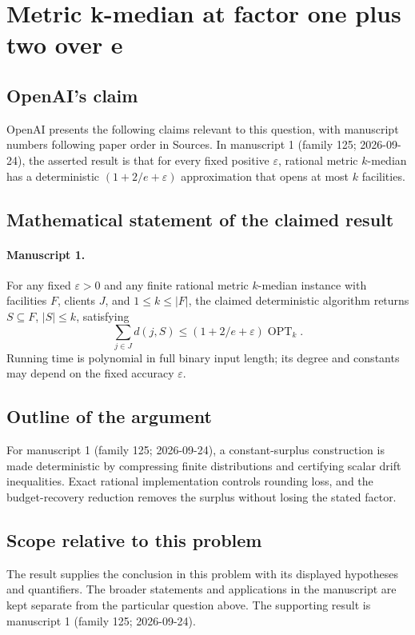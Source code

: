 \documentclass[11pt]{article}
\begin{document}
\section*{Metric k-median at factor one plus two over e}

\subsection{OpenAI's claim}
OpenAI presents the following claims relevant to this question, with manuscript numbers following paper order in Sources. In manuscript 1 (family 125; 2026-09-24), the asserted result is that for every fixed positive $\varepsilon$, rational metric $k$-median has a deterministic $(1+2/e+\varepsilon)$ approximation that opens at most $k$ facilities.

\subsection{Mathematical statement of the claimed result}
\paragraph{Manuscript 1.}
For any fixed $\varepsilon>0$ and any finite rational metric $k$-median instance with facilities $F$, clients $J$, and $1\le k\le|F|$, the claimed deterministic algorithm returns $S\subseteq F$, $|S|\le k$, satisfying
\[
 \sum_{j\in J}d(j,S)\le(1+2/e+\varepsilon)\operatorname{OPT}_k.
\]
Running time is polynomial in full binary input length; its degree and constants may depend on the fixed accuracy $\varepsilon$.

\subsection{Outline of the argument}
For manuscript 1 (family 125; 2026-09-24), a constant-surplus construction is made deterministic by compressing finite distributions and certifying scalar drift inequalities. Exact rational implementation controls rounding loss, and the budget-recovery reduction removes the surplus without losing the stated factor.

\subsection{Scope relative to this problem}
The result supplies the conclusion in this problem with its displayed hypotheses and quantifiers. The broader statements and applications in the manuscript are kept separate from the particular question above. The supporting result is manuscript 1 (family 125; 2026-09-24).
\end{document}
